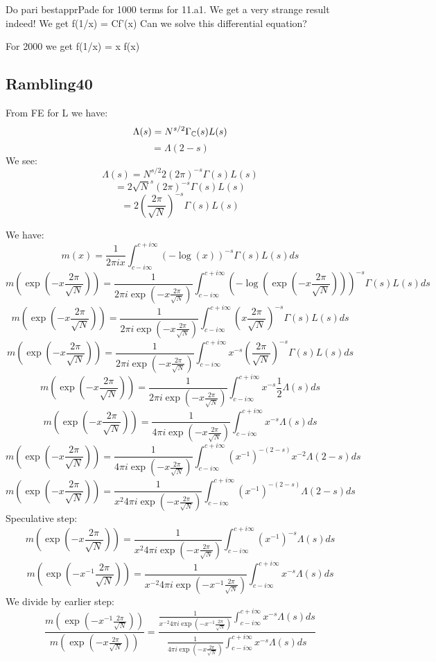 \documentclass[a4paper]{amsart}
\begin{document}
Do pari bestapprPade for 1000 terms for 11.a1. We get a very strange result indeed! We get f(1/x) = Cf'(x)
Can we solve this differential equation?

For 2000 we get f(1/x) = x f(x)


\subsection{Rambling40}

From FE for L we have:
$$\Lambda(s) = N^{s/2} \Gamma_{\mathbb{C}}(s) L(s)$$
$$ = \Lambda(2 - s)$$
We see: 
$$\Lambda(s) = N^{s/2} 2 (2\pi)^{-s} \Gamma(s) L(s)$$
$$ = 2 \sqrt{N}^{s} (2\pi)^{-s} \Gamma(s) L(s)$$
$$ = 2 \left(\frac{2\pi}{\sqrt{N}}\right)^{-s} \Gamma(s) L(s)$$

We have:
$$m(x) = \frac{1}{2\pi i x} \int_{c - i\infty}^{c + i\infty}(-\log(x))^{-s} \Gamma(s)L(s)ds$$
$$m(\exp\left(-x\frac{2\pi}{\sqrt{N}}\right)) = \frac{1}{2\pi i \exp\left(-x\frac{2\pi}{\sqrt{N}}\right)} \int_{c - i\infty}^{c + i\infty}(-\log(\exp\left(-x\frac{2\pi}{\sqrt{N}}\right)))^{-s} \Gamma(s)L(s)ds$$
$$m(\exp\left(-x\frac{2\pi}{\sqrt{N}}\right)) = \frac{1}{2\pi i \exp\left(-x\frac{2\pi}{\sqrt{N}}\right)} \int_{c - i\infty}^{c + i\infty}(x\frac{2\pi}{\sqrt{N}})^{-s} \Gamma(s)L(s)ds$$
$$m(\exp\left(-x\frac{2\pi}{\sqrt{N}}\right)) = \frac{1}{2\pi i \exp\left(-x\frac{2\pi}{\sqrt{N}}\right)} \int_{c - i\infty}^{c + i\infty}x^{-s}(\frac{2\pi}{\sqrt{N}})^{-s} \Gamma(s)L(s)ds$$
$$m(\exp\left(-x\frac{2\pi}{\sqrt{N}}\right)) = \frac{1}{2\pi i \exp\left(-x\frac{2\pi}{\sqrt{N}}\right)} \int_{c - i\infty}^{c + i\infty}x^{-s}\frac{1}{2}\Lambda(s)ds$$
$$m(\exp\left(-x\frac{2\pi}{\sqrt{N}}\right)) = \frac{1}{4\pi i \exp\left(-x\frac{2\pi}{\sqrt{N}}\right)} \int_{c - i\infty}^{c + i\infty}x^{-s}\Lambda(s)ds$$
$$m(\exp\left(-x\frac{2\pi}{\sqrt{N}}\right)) = \frac{1}{4\pi i \exp\left(-x\frac{2\pi}{\sqrt{N}}\right)} \int_{c - i\infty}^{c + i\infty}(x^{-1})^{-(2 - s)} x^{-2}\Lambda(2 - s)ds$$
$$m(\exp\left(-x\frac{2\pi}{\sqrt{N}}\right)) = \frac{1}{x^{2}4\pi i \exp\left(-x\frac{2\pi}{\sqrt{N}}\right)} \int_{c - i\infty}^{c + i\infty}(x^{-1})^{-(2 - s)}\Lambda(2 - s)ds$$
Speculative step:
$$m(\exp\left(-x\frac{2\pi}{\sqrt{N}}\right)) = \frac{1}{x^{2}4\pi i \exp\left(-x\frac{2\pi}{\sqrt{N}}\right)} \int_{c - i\infty}^{c + i\infty}(x^{-1})^{-s}\Lambda(s)ds$$
$$m(\exp\left(-x^{-1}\frac{2\pi}{\sqrt{N}}\right)) = \frac{1}{x^{-2}4\pi i \exp\left(-x^{-1}\frac{2\pi}{\sqrt{N}}\right)} \int_{c - i\infty}^{c + i\infty}x^{-s}\Lambda(s)ds$$
We divide by earlier step:
$$\frac{m(\exp\left(-x^{-1}\frac{2\pi}{\sqrt{N}}\right))}{m(\exp\left(-x\frac{2\pi}{\sqrt{N}}\right))} = \frac{\frac{1}{x^{-2}4\pi i \exp\left(-x^{-1}\frac{2\pi}{\sqrt{N}}\right)} \int_{c - i\infty}^{c + i\infty}x^{-s}\Lambda(s)ds}{\frac{1}{4\pi i \exp\left(-x\frac{2\pi}{\sqrt{N}}\right)} \int_{c - i\infty}^{c + i\infty}x^{-s}\Lambda(s)ds}$$
\end{document}
